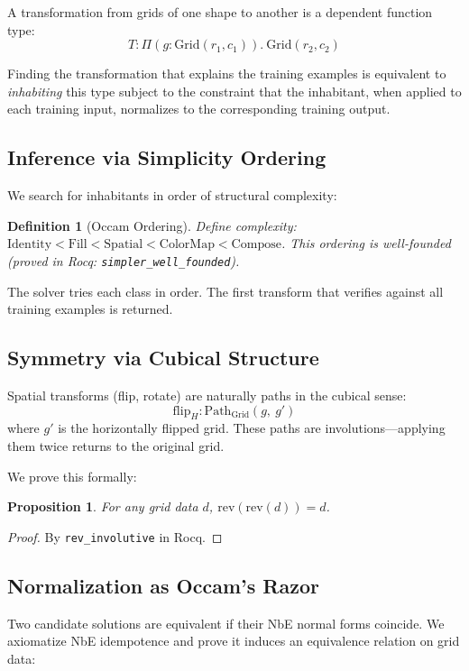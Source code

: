 \documentclass[11pt,a4paper]{article}
\newtheorem{proposition}[theorem]{Proposition}
\newtheorem{definition}[theorem]{Definition}
\newcommand{\Grid}{\mathrm{Grid}}
\begin{document}
A transformation from grids of one shape to another is a dependent
function type:
\[
  T : \Pi(g : \Grid(r_1, c_1)).\ \Grid(r_2, c_2)
\]

Finding the transformation that explains the training examples is
equivalent to \emph{inhabiting} this type subject to the constraint
that the inhabitant, when applied to each training input, normalizes
to the corresponding training output.

\subsection{Inference via Simplicity Ordering}

We search for inhabitants in order of structural complexity:

\begin{definition}[Occam Ordering]
Define complexity: $\mathrm{Identity} < \mathrm{Fill} < \mathrm{Spatial}
< \mathrm{ColorMap} < \mathrm{Compose}$.  This ordering is
well-founded (proved in Rocq: \texttt{simpler\_well\_founded}).
\end{definition}

The solver tries each class in order.  The first transform that
verifies against all training examples is returned.

\subsection{Symmetry via Cubical Structure}

Spatial transforms (flip, rotate) are naturally paths in the cubical
sense:
\[
  \mathrm{flip}_H : \mathrm{Path}_{\Grid}(g,\ g')
\]
where $g'$ is the horizontally flipped grid.  These paths are
involutions---applying them twice returns to the original grid.

We prove this formally:
\begin{proposition}
For any grid data $d$, $\mathrm{rev}(\mathrm{rev}(d)) = d$.
\end{proposition}
\begin{proof}
By \texttt{rev\_involutive} in Rocq.
\end{proof}

\subsection{Normalization as Occam's Razor}

Two candidate solutions are equivalent if their NbE normal forms
coincide.  We axiomatize NbE idempotence and prove it induces an
equivalence relation on grid data:
\end{document}
